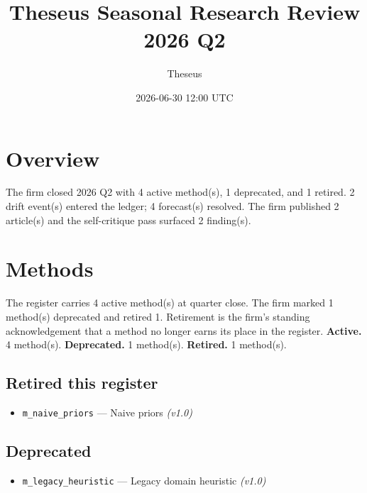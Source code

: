 \documentclass[11pt,letterpaper]{article}
\title{\textbf{Theseus Seasonal Research Review}\\[6pt]\large 2026 Q2}
\date{2026-06-30 12:00 UTC}
\author{Theseus}
\begin{document}
\maketitle
\thispagestyle{empty}

\begin{center}
\end{center}

\vspace{1.5em}

\section*{Overview}
The firm closed 2026 Q2 with 4 active method(s), 1 deprecated, and 1 retired. 2 drift event(s) entered the ledger; 4 forecast(s) resolved. The firm published 2 article(s) and the self-critique pass surfaced 2 finding(s).
\section{Methods}
The register carries 4 active method(s) at quarter close. The firm marked 1 method(s) deprecated and retired 1. Retirement is the firm's standing acknowledgement that a method no longer earns its place in the register.
\textbf{Active.} 4 method(s).
\textbf{Deprecated.} 1 method(s).
\textbf{Retired.} 1 method(s).

\subsection*{Retired this register}
\begin{itemize}[leftmargin=1.5em]
  \item \texttt{m\_naive\_priors} --- Naive priors \emph{(v1.0)}
\end{itemize}
\subsection*{Deprecated}
\begin{itemize}[leftmargin=1.5em]
  \item \texttt{m\_legacy\_heuristic} --- Legacy domain heuristic \emph{(v1.0)}
\end{itemize}
\end{document}

